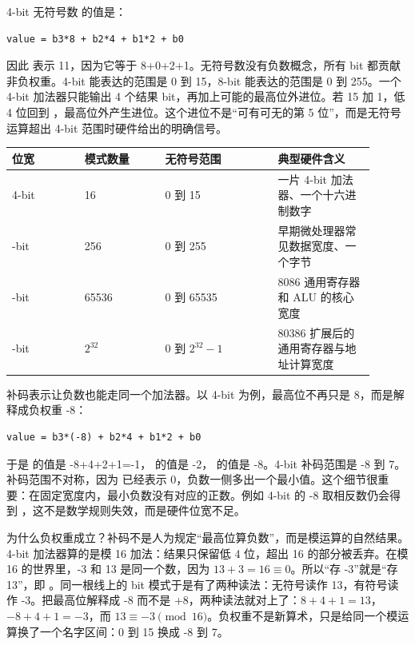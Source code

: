 4-bit 无符号数  的值是：

\begin{lstlisting}
value = b3*8 + b2*4 + b1*2 + b0
\end{lstlisting}

因此  表示 11，因为它等于 8+0+2+1。无符号数没有负数概念，所有 bit 都贡献非负权重。4-bit 能表达的范围是 0 到 15，8-bit 能表达的范围是 0 到 255。一个 4-bit 加法器只能输出 4 个结果 bit，再加上可能的最高位外进位。若 15 加 1，低 4 位回到 ，最高位外产生进位。这个进位不是“可有可无的第 5 位”，而是无符号运算超出 4-bit 范围时硬件给出的明确信号。

\begin{longtable}{L{0.18\linewidth}L{0.2\linewidth}L{0.28\linewidth}L{0.24\linewidth}}
\toprule
位宽 & 模式数量 & 无符号范围 & 典型硬件含义 \\
-bit & 16 & 0 到 15 & 一片 4-bit 加法器、一个十六进制数字 \\-bit & 256 & 0 到 255 & 早期微处理器常见数据宽度、一个字节 \\-bit & 65536 & 0 到 65535 & 8086 通用寄存器和 ALU 的核心宽度 \\-bit & $2^{32}$ & 0 到 $2^{32}-1$ & 80386 扩展后的通用寄存器与地址计算宽度 \\
\bottomrule
\end{longtable}

补码表示让负数也能走同一个加法器。以 4-bit 为例，最高位不再只是 8，而是解释成负权重 -8：

\begin{lstlisting}
value = b3*(-8) + b2*4 + b1*2 + b0
\end{lstlisting}

于是  的值是 -8+4+2+1=-1， 的值是 -2， 的值是 -8。4-bit 补码范围是 -8 到 7。补码范围不对称，因为  已经表示 0，负数一侧多出一个最小值。这个细节很重要：在固定宽度内，最小负数没有对应的正数。例如 4-bit 的 -8 取相反数仍会得到 ，这不是数学规则失效，而是硬件位宽不足。

为什么负权重成立？补码不是人为规定“最高位算负数”，而是模运算的自然结果。4-bit 加法器算的是模 16 加法：结果只保留低 4 位，超出 16 的部分被丢弃。在模 16 的世界里，-3 和 13 是同一个数，因为 $13+3=16\equiv 0$。所以“存 -3”就是“存 13”，即 。同一根线上的 bit 模式于是有了两种读法：无符号读作 13，有符号读作 -3。把最高位解释成 -8 而不是 +8，两种读法就对上了：$8+4+1=13$，$-8+4+1=-3$，而 $13\equiv-3 \pmod{16}$。负权重不是新算术，只是给同一个模运算换了一个名字区间：0 到 15 换成 -8 到 7。

